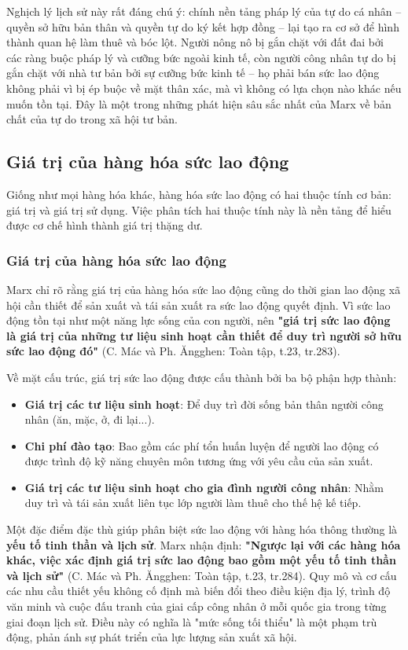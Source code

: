 Nghịch lý lịch sử này rất đáng chú ý: chính nền tảng pháp lý của tự do cá nhân – quyền sở hữu bản thân và quyền tự do ký kết hợp đồng – lại tạo ra cơ sở để hình thành quan hệ làm thuê và bóc lột. Người nông nô bị gắn chặt với đất đai bởi các ràng buộc pháp lý và cưỡng bức ngoài kinh tế, còn người công nhân tự do bị gắn chặt với nhà tư bản bởi sự cưỡng bức kinh tế – họ phải bán sức lao động không phải vì bị ép buộc về mặt thân xác, mà vì không có lựa chọn nào khác nếu muốn tồn tại. Đây là một trong những phát hiện sâu sắc nhất của Marx về bản chất của tự do trong xã hội tư bản.

\subsection{Giá trị của hàng hóa sức lao động}
Giống như mọi hàng hóa khác, hàng hóa sức lao động có hai thuộc tính cơ bản: giá trị và giá trị sử dụng. Việc phân tích hai thuộc tính này là nền tảng để hiểu được cơ chế hình thành giá trị thặng dư.
\subsubsection{Giá trị của hàng hóa sức lao động}
Marx chỉ rõ rằng giá trị của hàng hóa sức lao động cũng do thời gian lao động xã hội cần thiết để sản xuất và tái sản xuất ra sức lao động quyết định. Vì sức lao động tồn tại như một năng lực sống của con người, nên \textbf{"giá trị sức lao động là giá trị của những tư liệu sinh hoạt cần thiết để duy trì người sở hữu sức lao động đó"} (C. Mác và Ph. Ăngghen: Toàn tập, t.23, tr.283).

Về mặt cấu trúc, giá trị sức lao động được cấu thành bởi ba bộ phận hợp thành:
\begin{itemize}
    \item \textbf{Giá trị các tư liệu sinh hoạt}: Để duy trì đời sống bản thân người công nhân (ăn, mặc, ở, đi lại...).
    \item \textbf{Chi phí đào tạo}: Bao gồm các phí tổn huấn luyện để người lao động có được trình độ kỹ năng chuyên môn tương ứng với yêu cầu của sản xuất.
    \item \textbf{Giá trị các tư liệu sinh hoạt cho gia đình người công nhân}: Nhằm duy trì và tái sản xuất liên tục lớp người làm thuê cho thế hệ kế tiếp.
\end{itemize}
Một đặc điểm đặc thù giúp phân biệt sức lao động với hàng hóa thông thường là \textbf{yếu tố tinh thần và lịch sử}. Marx nhận định: \textbf{"Ngược lại với các hàng hóa khác, việc xác định giá trị sức lao động bao gồm một yếu tố tinh thần và lịch sử"} (C. Mác và Ph. Ăngghen: Toàn tập, t.23, tr.284). Quy mô và cơ cấu các nhu cầu thiết yếu không cố định mà biến đổi theo điều kiện địa lý, trình độ văn minh và cuộc đấu tranh của giai cấp công nhân ở mỗi quốc gia trong từng giai đoạn lịch sử. Điều này có nghĩa là "mức sống tối thiểu" là một phạm trù động, phản ánh sự phát triển của lực lượng sản xuất xã hội.

